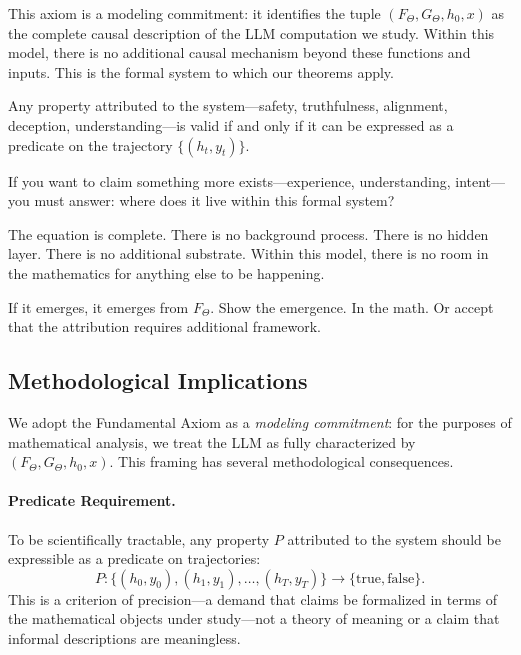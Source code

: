 \documentclass[11pt,a4paper]{article}
\begin{document}
This axiom is a modeling commitment: it identifies the tuple $(F_\Theta, G_\Theta, h_0, x)$ as the complete causal description of the LLM computation we study. Within this model, there is no additional causal mechanism beyond these functions and inputs. This is the formal system to which our theorems apply.

Any property attributed to the system---safety, truthfulness, alignment, deception, understanding---is valid if and only if it can be expressed as a predicate on the trajectory $\{(h_t, y_t)\}$.

If you want to claim something more exists---experience, understanding, intent---you must answer: where does it live within this formal system?

The equation is complete. There is no background process. There is no hidden layer. There is no additional substrate. Within this model, there is no room in the mathematics for anything else to be happening.

If it emerges, it emerges from $F_\Theta$. Show the emergence. In the math. Or accept that the attribution requires additional framework.

\subsection{Methodological Implications}

We adopt the Fundamental Axiom as a \emph{modeling commitment}: for the purposes of mathematical analysis, we treat the LLM as fully characterized by $(F_\Theta, G_\Theta, h_0, x)$. This framing has several methodological consequences.

\paragraph{Predicate Requirement.}
To be scientifically tractable, any property $P$ attributed to the system should be expressible as a predicate on trajectories:
\[
P: \{(h_0, y_0), (h_1, y_1), \ldots, (h_T, y_T)\} \to \{\text{true}, \text{false}\}.
\]
This is a criterion of precision---a demand that claims be formalized in terms of the mathematical objects under study---not a theory of meaning or a claim that informal descriptions are meaningless.
\end{document}
